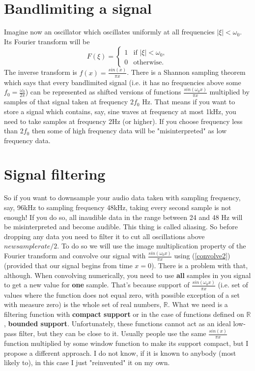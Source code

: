 \documentclass[a4paper,11pt,fleqn]{article}
\let\oldref\ref
\renewcommand{\ref}[1]{(\oldref{#1})}
\begin{document}
\section{Bandlimiting a signal}
Imagine now an oscillator which oscillates uniformly at all frequencies $\left|\xi\right| < \omega_{0}$. 
Its Fourier transform will be
\begin{equation}
\label{idealfilter}
F(\xi) = \left\{
\begin{array}{rl}
1 & \text{if } \left|\xi\right| < \omega_{0},\\
0 & \text{otherwise}.
\end{array} \right.
\end{equation}
The inverse transform is $f(x) = \frac{sin(x)}{\pi x}$. There is a Shannon sampling theorem which says that every
bandlimited signal (i.e. it has no frequencies above some $f_{0}=\frac{\omega_{0}}{2\pi}$) can be represented as 
shifted versions of functions $\frac{sin(\omega_{0}x)}{\pi x}$ multiplied by samples of that signal taken at frequency
$2f_{0}$ Hz. That means if you want to store a signal which contains, say, sine waves at frequency
at most 1kHz, you need to take samples at frequency 2Hz (or higher). If you choose frequency less than $2f_{0}$ then
some of high frequency data will be "misinterpreted" as low frequency data.
\section{Signal filtering}
So if you want to downsample your audio data taken with sampling frequency, say, 96kHz to sampling frequency 48kHz, taking
every second sample is not enough! If you do so, all inaudible data in the range between 24 and 48 Hz will be misinterpreted
and become audible. This thing is called aliasing. So before dropping any data you need to filter it to cut all oscillations
above $newsamplerate / 2$. To do so we will use the image multiplication property of the Fourier transform and convolve
our signal with $\frac{sin(\omega_{0}x)}{\pi x}$ using \ref{convolve2} (provided that our signal begins from time $x=0$). There is
a problem with that, although. When convolving numerically, you need to use \textbf{all} samples in you signal to get a new value
for \textbf{one} sample. That's because support of $\frac{sin(\omega_{0}x)}{\pi x}$ (i.e. set of values where the function does not equal
zero, with possible exception of a set with measure zero) is the whole set of real numbers, $\mathbb{R}$. What we need is a
filtering function with \textbf{compact support} or in the case of functions defined on $\mathbb{R}$, \textbf{bounded support}.
Unfortunately, these functions cannot act as an ideal low-pass filter, but they can be close to it. Usually people use the same
$\frac{sin(x)}{\pi x}$ function multiplied by some window function to make its support compact, but I propose a different approach.
I do not know, if it is known to anybody (most likely to), in this case I just "reinvented" it on my own.
\end{document}

